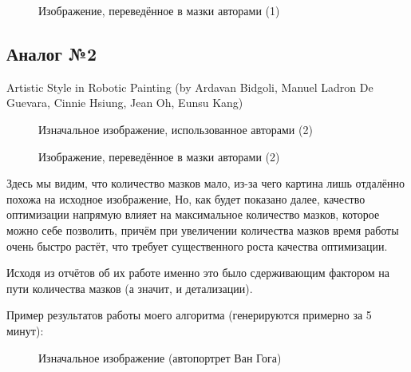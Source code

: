 \documentclass[11pt]{article}
\begin{document}
    \begin{figure}[h!]
        \centering
        \caption{Изображение, переведённое в мазки авторами (1)}
        \label{fig:result_hod}
    \end{figure}

    \FloatBarrier

    \subsection{Аналог №2}\label{subsec:analog-2}
    Artistic Style in Robotic Painting (by Ardavan Bidgoli, Manuel Ladron De Guevara, Cinnie Hsiung, Jean Oh, Eunsu Kang)

    \begin{figure}[h!]
        \centering
        \caption{Изначальное изображение, использованное авторами (2)}
        \label{fig:initial_bidgoli}
    \end{figure}

    \begin{figure}[h!]
        \centering
        \caption{Изображение, переведённое в мазки авторами (2)}
        \label{fig:result_bidgoli}
    \end{figure}

    \FloatBarrier


    Здесь мы видим, что количество мазков мало, из-за чего картина лишь отдалённо похожа на исходное изображение,
    Но, как будет показано далее, качество оптимизации напрямую влияет на максимальное количество мазков, которое можно себе позволить,
    причём при увеличении количества мазков время работы очень быстро растёт, что требует существенного роста качества оптимизации.

    Исходя из отчётов об их работе именно это было сдерживающим фактором на пути количества мазков (а значит, и детализации).

    Пример результатов работы моего алгоритма (генерируются примерно за 5 минут):

    \begin{figure}[h!]
        \centering
        \caption{Изначальное изображение (автопортрет Ван Гога)}
        \label{fig:van-gog-original}
    \end{figure}
    \FloatBarrier
\end{document}
